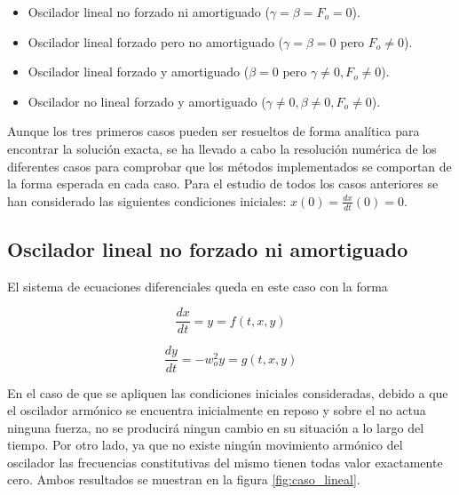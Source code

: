 \documentclass[11pt]{article}
\begin{document}
\begin{itemize}
	\item Oscilador lineal no forzado ni amortiguado ($\gamma = \beta = F_o = 0$).
	\item Oscilador lineal forzado pero no amortiguado ($\gamma = \beta = 0$ pero $F_o \neq 0$).
	\item Oscilador lineal forzado y amortiguado ($\beta = 0$ pero $\gamma \neq 0, F_o \neq0$).
	\item Oscilador no lineal forzado y amortiguado ($\gamma \neq 0, \beta \neq 0, F_o \neq 0$).
\end{itemize}

Aunque los tres primeros casos pueden ser resueltos de forma analítica para encontrar la solución exacta, se ha llevado a cabo la resolución numérica de los diferentes casos para comprobar que los métodos implementados se comportan de la forma esperada en cada caso. Para el estudio de todos los casos anteriores se han considerado las siguientes condiciones iniciales: $x(0) = \frac{dx}{dt}(0) = 0$.

\subsection{Oscilador lineal no forzado ni amortiguado}
El sistema de ecuaciones diferenciales queda en este caso con la forma 

\begin{equation}
	\frac{dx}{dt} = y = f(t, x, y)
\end{equation}

\begin{equation}
	\frac{dy}{dt} = -w_o^2 y = g(t, x, y)
\end{equation}

En el caso de que se apliquen las condiciones iniciales consideradas, debido a que el oscilador armónico se encuentra inicialmente en reposo y sobre el no actua ninguna fuerza, no se producirá ningun cambio en su situación a lo largo del tiempo. Por otro lado, ya que no existe ningún movimiento armónico del oscilador las frecuencias constitutivas del mismo tienen todas valor exactamente cero. Ambos resultados se muestran en la figura \ref{fig:caso_lineal}.
\end{document}
